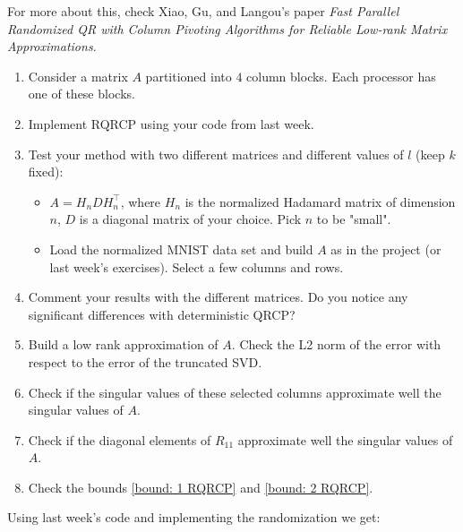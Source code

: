 \documentclass[11pt]{article}
\begin{document}
For more about this, check Xiao, Gu, and Langou's paper \textit{Fast Parallel Randomized QR with Column Pivoting Algorithms for
Reliable Low-rank Matrix Approximations}.


\begin{enumerate}
   \item Consider a matrix $A$ partitioned into $4$ column blocks. Each processor has one of these blocks.
   \item Implement RQRCP using your code from last week.
   \item Test your method with two different matrices and different values of $l$ (keep $k$ fixed): 
   \begin{itemize}
       \item $A = H_{n}DH_{n}^{\top}$, where $H_{n}$ is the normalized Hadamard matrix of dimension $n$, $D$ is a diagonal matrix of your choice. Pick $n$ to be "small".
       \item Load the normalized MNIST data set and build $A$ as in the project (or last week's exercises). Select a few columns and rows.
   \end{itemize}
   \item Comment your results with the different matrices. Do you notice any significant differences with deterministic QRCP?
   \item Build a low rank approximation of $A$. Check the L2 norm of the error with respect to the error of the truncated SVD.
   \item Check if the singular values of these selected columns approximate well the singular values of $A$.
   \item Check if the diagonal elements of $R_{11}$ approximate well the singular values of $A$.
   \item Check the bounds \ref{bound: 1 RQRCP} and \ref{bound: 2 RQRCP}.
\end{enumerate}


Using last week's code and implementing the randomization we get:


\end{document}
